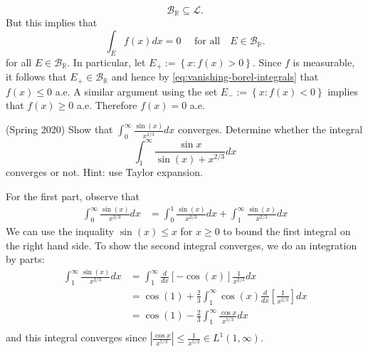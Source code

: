 \documentclass[answers]{exam}
\DeclareMathOperator{\RR}{\mathbb{R}}
\begin{document}
\begin{questions}
\begin{solution}
\begin{equation*}
  \mathcal{B}_{\RR}\subseteq  \mathcal{L}.
\end{equation*}
But this implies that
\begin{equation}\label{eq:vanishing-borel-integrals}
  \int_{E}f(x)dx = 0 \quad\text{ for all}\quad E\in \mathcal{B}_{\RR}.
\end{equation}
for all $E\in \mathcal{B}_{\RR}$. In particular, let $E_{+}:= \left\{x:
  f(x)>0\right\}$. Since $f$ is measurable, it follows that $E_{+}\in \mathcal{B}_{\RR}$
and hence by \eqref{eq:vanishing-borel-integrals} that $f(x)\leq 0$ a.e. A
similar argument using the set $E_{-}:= \left\{x: f(x)<0\right\}$ implies that
$f(x)\geq 0$ a.e. Therefore $f(x)=0$ a.e.
\end{solution}





\question (Spring 2020) Show that $\int_{0}^{\infty}\frac{\sin(x)}{x^{2/3}}dx$
converges. Determine whether the integral
\begin{equation*}
  \int_{1}^{\infty}\frac{\sin x}{\sin(x) +x^{2/3}} dx 
\end{equation*}
converges or not. Hint: use Taylor expansion.

\begin{solution}
For the first part, observe that
\begin{align*}
  \int_{0}^{\infty}\frac{\sin(x)}{x^{2/3}}dx
  &=  \int_{0}^{1}\frac{\sin(x)}{x^{2/3}}dx +  \int_{1}^{\infty}\frac{\sin(x)}{x^{2/3}}dx 
\end{align*}
We can use the inquality $\sin(x) \leq x$ for $x \geq 0$ to bound the first
integral on the right hand side. To show the second integral converges, we do
an integration by parts:
\begin{align*}
  \int_{1}^{\infty}\frac{\sin(x)}{x^{2/3}}dx
  &= \int_{1}^{\infty}\frac{d}{dx}\left[ -\cos(x) \right] \frac{1}{x^{2/3}}dx\\ 
  &= \cos(1) + \frac{2}{3}\int_{1}^{\infty}\cos(x) \frac{d}{dx} \left[  \frac{1}{x^{2/3}} \right] dx\\ 
  &= \cos(1) - \frac{2}{3}\int_{1}^{\infty} \frac{\cos x}{x^{5/3}} dx\\ 
\end{align*}
and this integral converges since $\left| \frac{\cos x}{x^{5/3}}  \right| \leq
\frac{1}{x^{5/3}}\in L^{1}(1,\infty)$.  


\end{solution}
\end{questions}
\end{document}
